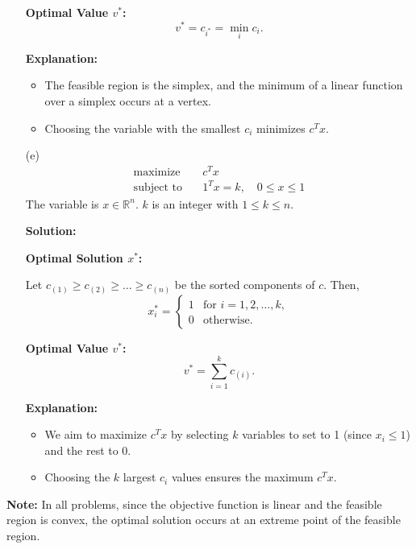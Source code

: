 \documentclass{article}
\begin{document}
\begin{enumerate}
    \textbf{Optimal Value $v^*$:}
    \[
    v^* = c_{i^*} = \min_{i} c_i.
    \]

    \textbf{Explanation:}
    \begin{itemize}
    \item The feasible region is the simplex, and the minimum of a linear function over a simplex occurs at a vertex.
    \item Choosing the variable with the smallest $c_i$ minimizes $c^T x$.
    \end{itemize}

    \item[(e)]
    \begin{align*}
        \text{maximize} \quad & c^T x \\
        \text{subject to} \quad & 1^T x = k, \quad 0 \leq x \leq 1
    \end{align*}
    The variable is $x \in \mathbb{R}^n$. $k$ is an integer with $1 \leq k \leq n$.

    \textbf{Solution:}

    \textbf{Optimal Solution $x^*$:}

    Let $c_{(1)} \geq c_{(2)} \geq \dots \geq c_{(n)}$ be the sorted components of $c$. Then,
    \[
    x_i^* = \begin{cases}
    1 & \text{for } i = 1, 2, \dots, k, \\
    0 & \text{otherwise}.
    \end{cases}
    \]

    \textbf{Optimal Value $v^*$:}
    \[
    v^* = \sum_{i=1}^{k} c_{(i)}.
    \]

    \textbf{Explanation:}
    \begin{itemize}
    \item We aim to maximize $c^T x$ by selecting $k$ variables to set to 1 (since $x_i \leq 1$) and the rest to 0.
    \item Choosing the $k$ largest $c_i$ values ensures the maximum $c^T x$.
    \end{itemize}
\end{enumerate}

\textbf{Note:} In all problems, since the objective function is linear and the feasible region is convex, the optimal solution occurs at an extreme point of the feasible region.
\end{document}
